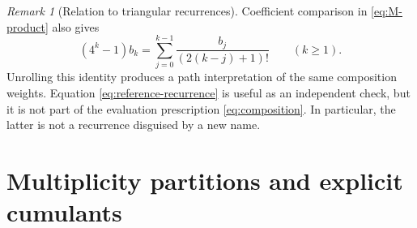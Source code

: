 \documentclass[11pt,a4paper]{article}
\theoremstyle{definition}
\theoremstyle{remark}
\newtheorem{remark}[theorem]{Remark}
\begin{document}
\begin{remark}[Relation to triangular recurrences]
Coefficient comparison in \eqref{eq:M-product} also gives
\begin{equation}
 (4^k-1)b_k=\sum_{j=0}^{k-1}\frac{b_j}{(2(k-j)+1)!}
 \qquad(k\geq1).                                        \label{eq:reference-recurrence}
\end{equation}
Unrolling this identity produces a path interpretation of the same composition
weights.  Equation \eqref{eq:reference-recurrence} is useful as an independent
check, but it is not part of the evaluation prescription
\eqref{eq:composition}.  In particular, the latter is not a recurrence disguised
by a new name.
\end{remark}

\section{Multiplicity partitions and explicit cumulants}
\label{sec:partition}
\end{document}
